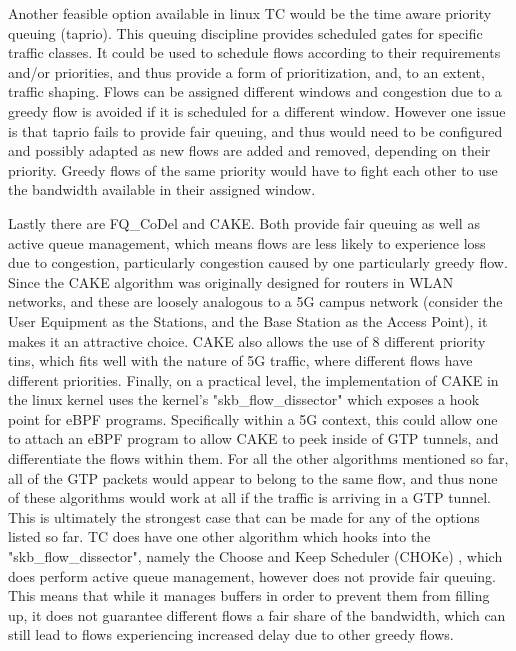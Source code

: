 Another feasible option available in linux TC would be the time aware priority queuing (taprio). This queuing discipline provides scheduled gates for specific traffic classes. It could be used to schedule flows according to their requirements and/or priorities, and thus provide a form of prioritization, and, to an extent, traffic shaping. Flows can be assigned different windows and congestion due to a greedy flow is avoided if it is scheduled for a different window. However one issue is that taprio fails to provide fair queuing, and thus would need to be configured and possibly adapted as new flows are added and removed, depending on their priority. Greedy flows of the same priority would have to fight each other to use the bandwidth available in their assigned window.

Lastly there are FQ\_CoDel and CAKE. Both provide fair queuing as well as active queue management, which means flows are less likely to experience loss due to congestion, particularly congestion caused by one particularly greedy flow. Since the CAKE algorithm was originally designed for routers in WLAN networks, and these are loosely analogous to a 5G campus network (consider the User Equipment as the Stations, and the Base Station as the Access Point), it makes it an attractive choice. CAKE also allows the use of 8 different priority tins, which fits well with the nature of 5G traffic, where different flows have different priorities. Finally, on a practical level, the implementation of CAKE in the linux kernel uses the kernel's "skb\_flow\_dissector" which exposes a hook point for eBPF \cite{eBPF} programs. Specifically within a 5G context, this could allow one to attach an eBPF program to allow CAKE to peek inside of GTP tunnels, and differentiate the flows within them. For all the other algorithms mentioned so far, all of the GTP packets would appear to belong to the same flow, and thus none of these algorithms would work at all if the traffic is arriving in a GTP tunnel. This is ultimately the strongest case that can be made for any of the options listed so far. TC does have one other algorithm which hooks into the "skb\_flow\_dissector", namely the Choose and Keep Scheduler (CHOKe) \cite{choke}, which does perform active queue management, however does not provide fair queuing. This means that while it manages buffers in order to prevent them from filling up, it does not guarantee different flows a fair share of the bandwidth, which can still lead to flows experiencing increased delay due to other greedy flows.

